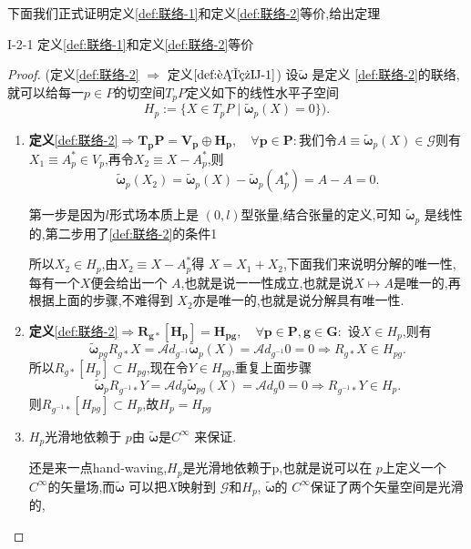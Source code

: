 \documentclass[../main.tex]{subfiles}
\begin{document}
    下面我们正式证明定义\ref{def:联络-1}和定义\ref{def:联络-2}等价,给出定理
     \begin{theorem}
       {}{I-2-1} 
       定义\ref{def:联络-1}和定义\ref{def:联络-2}等价
    \end{theorem}
    \begin{proof}
      (定义\ref{def:联络-2} $\Rightarrow$ 定义$\ref{def:联络-1}$) 设$\bm{\tilde{\omega}} $ 是定义 \ref{def:联络-2}的联络,就可以给每一$p\in P$的切空间$T_pP$定义如下的线性水平子空间 
      \[
        H_p := \{X \in T_pP \mid \bm{\tilde{\omega}}_p(X) = 0\})  
      .\] 
      \begin{enumerate}
        \item \textbf{定义}\ref{def:联络-2}$\bm{\Rightarrow T_pP = V_p \oplus H_p, \quad \forall p \in P} :$我们令$A \equiv \bm{\tilde{\omega}}_p(X) \in \mathscr{G}$则有$X_1 \equiv A^*_p \in V_p $,再令$X_2 \equiv X - A^*_p$,则 \[
            \bm{\tilde{\omega}}_p(X_2) =\bm{\tilde{\omega}}_p(X) - \bm{\tilde{\omega}}_p(A^*_p) =  A - A = 0
        .\] 
        \begin{note}
          第一步是因为$l$形式场本质上是 $(0,l)$型张量,结合张量的定义,可知 $\bm{\tilde{\omega}}_p$ 是线性的,第二步用了\ref{def:联络-2}的条件1
        \end{note}
        所以$X_2 \in H_p$,由$X_2 \equiv X -A^*_p$得 $X = X_1 +X_2$,下面我们来说明分解的唯一性,每有一个$X$便会给出一个 $A$,也就是说一一性成立,也就是说$X \mapsto A$是唯一的,再根据上面的步骤,不难得到
         $X_2$亦是唯一的,也就是说分解具有唯一性.
       \item \textbf{定义}\ref{def:联络-2}$\bm{\Rightarrow R_{g*}[H_p] = H_{pg},\quad \forall p\in P, g \in G :}$ 
         设$X \in H_p$,则有 \[
           \bm{\tilde{\omega}}_{pg}{R_{g*}X} = \mathscr{A}\!d_{g^{-1}}\bm{\tilde{\omega}}_p(X) = \mathscr{A}\!d_{g^{-1}}0 = 0 \Rightarrow R_{g*}X \in H_{pg} 
         .\] 
         所以$R_{g*}[H_p]\subset H_{pg}$,现在令$Y \in H_{pg}$,重复上面步骤\[
           \bm{\tilde{\omega}}_{p}{R_{g^{-1}*}Y} = \mathscr{A}\!d_{g}\bm{\tilde{\omega}}_{pg}(X) = \mathscr{A}\!d_{g}0 = 0 \Rightarrow R_{g^{-1}*}Y \in H_{p} 
         .\] 则$R_{g^{-1}*} [H_{pg}] \subset H_p$,故$H_p = H_{pg}$
       \item $H_p$光滑地依赖于 $p$由 $\bm{\tilde{\omega}}$是$C^\infty$ 来保证.
         \begin{note}
           还是来一点hand-waving,$H_p$是光滑地依赖于p,也就是说可以在 $p$上定义一个 $C^\infty$的矢量场,而$\bm{\tilde{\omega}}$ 可以把$X$映射到 $\mathscr{G}$和$H_p$, $\bm{\tilde{\omega}}$的 $C^\infty$保证了两个矢量空间是光滑的,

\end{note}
\end{enumerate}
\end{proof}
\end{document}
